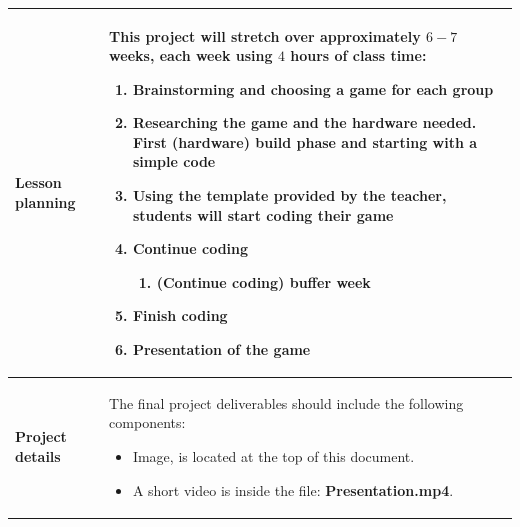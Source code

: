 \documentclass[10pt]{article}
\begin{document}
\begin{longtable}{|p{3.5cm}|p{11cm}|}
  \textbf{Lesson planning} & 
  This project will stretch over approximately $6-7$ weeks, each week using $4$ hours of class time:
  \begin{enumerate}
    \item Brainstorming and choosing a game for each group
    \item Researching the game and the hardware needed. First (hardware) build phase and starting with a simple code
    \item Using the template provided by the teacher, students will start coding their game
    \item Continue coding
    \begin{enumerate}
      \item (Continue coding) buffer week
    \end{enumerate}
    \item Finish coding
    \item Presentation of the game
  \end{enumerate}
  \\ \hline
  \textbf{Project details} & 
The final project deliverables should include the following components:
\begin{itemize}
    \item Image, is located at the top of this document.
    \item A short video is inside the file: \textbf{Presentation.mp4}.
\end{itemize}
\\ \hline

\end{longtable}
\end{document}
